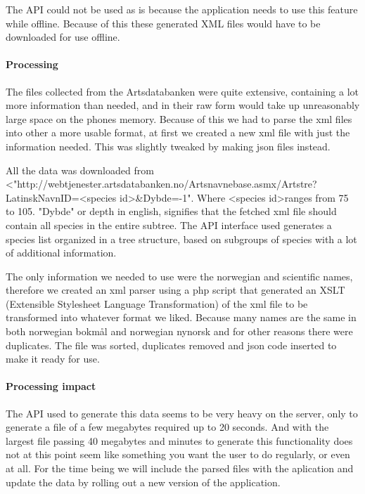 		The API could not be used as is because the application needs to use this feature while offline. Because of this these generated XML files would have to be downloaded for use offline.

		\paragraph{Processing}
		The files collected from the Artsdatabanken were quite extensive, containing a lot more information than needed, and in their raw form would take up unreasonably large space on the phones memory. 
		Because of this we had to parse the xml files into other a more usable format, at first we created a new xml file with just the information needed. 
		This was slightly tweaked by making json files instead.

		All the data was downloaded from
		<\newline"http://webtjenester.artsdatabanken.no/Artsnavnebase.asmx/Artstre? \newline LatinskNavnID=\textless species id\textgreater\&Dybde=-1".
		Where \textless species id\textgreater ranges from 75 to 105. "Dybde" or depth in english, signifies that the fetched xml file should contain all species in the entire subtree.
		The API interface used generates a species list organized in a tree structure, based on subgroups of species with a lot of additional information.

		The only information we needed to use were the norwegian and scientific names, therefore we created an xml parser using a php script that generated an XSLT (Extensible Stylesheet Language Transformation\cite{w3:xslt}) of the xml file to be transformed into whatever format we liked.
		Because many names are the same in both norwegian bokmål and norwegian nynorsk and for other reasons there were duplicates.
		The file was sorted, duplicates removed and json code inserted to make it ready for use.

		\paragraph{Processing impact}
		The API used to generate this data seems to be very heavy on the server, only to generate a file of a few megabytes required up to 20 seconds. 
		And with the largest file passing 40 megabytes and minutes to generate this functionality does not at this point seem like something you want the user to do regularly, or even at all. 
		For the time being we will include the parsed files with the aplication and update the data by rolling out a new version of the application.

